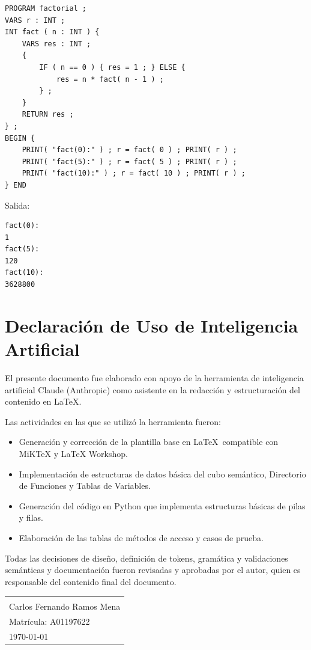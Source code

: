 \documentclass[12pt, letterpaper]{article}
\theoremstyle{definition}
\begin{document}
\begin{verbatim}
PROGRAM factorial ;
VARS r : INT ;
INT fact ( n : INT ) {
    VARS res : INT ;
    {
        IF ( n == 0 ) { res = 1 ; } ELSE {
            res = n * fact( n - 1 ) ;
        } ;
    }
    RETURN res ;
} ;
BEGIN {
    PRINT( "fact(0):" ) ; r = fact( 0 ) ; PRINT( r ) ;
    PRINT( "fact(5):" ) ; r = fact( 5 ) ; PRINT( r ) ;
    PRINT( "fact(10):" ) ; r = fact( 10 ) ; PRINT( r ) ;
} END
\end{verbatim}

Salida:
\begin{verbatim}
fact(0):
1
fact(5):
120
fact(10):
3628800
\end{verbatim}


\section*{Declaración de Uso de Inteligencia Artificial}

El presente documento fue elaborado con apoyo de la herramienta de
inteligencia artificial Claude (Anthropic) como asistente en la
redacción y estructuración del contenido en \LaTeX.

Las actividades en las que se utilizó la herramienta fueron:

\begin{itemize}
    \item Generación y corrección de la plantilla base en \LaTeX\
          compatible con MiKTeX y LaTeX Workshop. 
    \item Implementación de estructuras de datos básica del cubo semántico, Directorio de Funciones y
          Tablas de Variables.
    \item Generación del código en Python que implementa estructuras básicas
          de pilas y filas.
    \item Elaboración de las tablas de métodos de acceso y casos de prueba.
\end{itemize}

Todas las decisiones de diseño, definición de tokens, gramática
y validaciones semánticas y documentación fueron revisadas y aprobadas por el
autor, quien es responsable del contenido final del documento.

\vspace{1cm}
\noindent
\begin{tabular}{@{}p{6cm}@{}}
    \hline \\[-0.8em]
    Carlos Fernando Ramos Mena \\
    Matrícula: A01197622 \\
    \today
\end{tabular}
\end{document}

